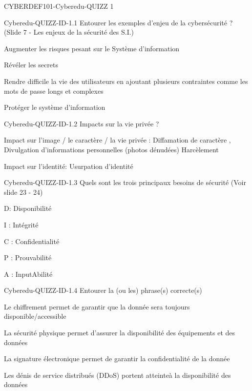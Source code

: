 \documentclass[12pt]{article}
\begin{document}
   \begin{quiz}{CYBERDEF101-Cyberedu-QUIZZ 1}


\begin{multi}[multiple=true]{Cyberedu-QUIZZ-ID-1.1}
	Entourer les exemples d'enjeu de la cybers\'ecurit\'e ? (Slide 7 - Les enjeux de la s\'ecurit\'e des S.I.)
\item 	Augmenter les risques pesant sur le Syst\`eme d'information
\item 	R\'ev\'eler les secrets
\item	Rendre difficile la vie des utilisateurs en ajoutant plusieurs contraintes comme les mots de passe longs et complexes
\item* 	Prot\'eger le syst\`eme d'information
\end{multi}

\begin{multi}[multiple=true]{Cyberedu-QUIZZ-ID-1.2}
	Impacts sur la vie priv\'ee  ?
\item* 	Impact sur l'image / le caract\`ere / la vie priv\'ee : Diffamation de caract\`ere , Divulgation d'informations personnelles (photos d\'enud\'ees) Harc\`element
\item*	Impact sur l'identit\'e: Usurpation d'identit\'e
 \end{multi}

\begin{multi}[multiple=true]{Cyberedu-QUIZZ-ID-1.3}
	Quels sont les trois principaux besoins de s\'ecurit\'e (Voir slide 23 - 24)
\item* 	D: Disponibilit\'e
\item* 	I : Int\'egrit\'e
\item*	C : Confidentialit\'e
\item  P : Prouvabilit\'e
\item  A : InputAbilit\'e
\end{multi}


\begin{multi}[multiple=true]{Cyberedu-QUIZZ-ID-1.4}
	Entourer la (ou les) phrase(s) correcte(s)
\item 	Le chiffrement permet de garantir que la donn\'ee sera toujours disponible/accessible
\item* 	La s\'ecurit\'e physique permet d'assurer la disponibilit\'e des \'equipements et des donn\'ees
\item 	La signature \'electronique permet de garantir la confidentialit\'e de la donn\'ee
\item*	Les d\'enis de service distribu\'es (DDoS) portent atteinte\`a la disponibilit\'e des donn\'ees
\end{multi}




\end{quiz}
\end{document}
